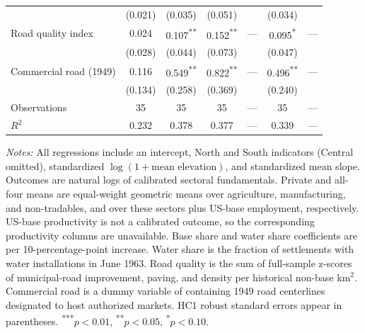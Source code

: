\documentclass[12pt, unicode, a4paper]{article}
\newcommand{\1}{\mbox{1}\hspace{-0.25em}\mbox{l}} %
\begin{document}
{\begin{table}[!htbp]
\begin{tabular*}{\linewidth}{@{\extracolsep{\fill}}lcccccc@{}}
 & (0.021) & (0.035) & (0.051) &  & (0.034) &  \\
Road quality index & 0.024 & 0.107\textsuperscript{**} & 0.152\textsuperscript{**} & --- & 0.095\textsuperscript{*} & --- \\
 & (0.028) & (0.044) & (0.073) &  & (0.047) &  \\
Commercial road (1949) & 0.116 & 0.549\textsuperscript{**} & 0.822\textsuperscript{**} & --- & 0.496\textsuperscript{**} & --- \\
 & (0.134) & (0.258) & (0.369) &  & (0.240) &  \\
\addlinespace[2pt]
Observations & 35 & 35 & 35 & --- & 35 & --- \\
\(R^{2}\) & 0.232 & 0.378 & 0.377 & --- & 0.339 & --- \\
\bottomrule
\end{tabular*}
\par\smallskip
\parbox{0.98\linewidth}{\fontsize{8}{9.5}\selectfont \textit{Notes:} All regressions include an intercept, North and South indicators (Central omitted), standardized $\log(1+\text{mean elevation})$, and standardized mean slope. Outcomes are natural logs of calibrated sectoral fundamentals. Private and all-four means are equal-weight geometric means over agriculture, manufacturing, and non-tradables, and over these sectors plus US-base employment, respectively. US-base productivity is not a calibrated outcome, so the corresponding productivity columns are unavailable. Base share and water share coefficients are per 10-percentage-point increase. Water share is the fraction of settlements with water installations in June 1963. Road quality is the sum of full-sample z-scores of municipal-road improvement, paving, and density per historical non-base km$^2$. Commercial road is a dummy variable of containing 1949 road centerlines designated to host authorized markets. HC1 robust standard errors appear in parentheses. \textsuperscript{***}$p<0.01$, \textsuperscript{**}$p<0.05$, \textsuperscript{*}$p<0.10$.}
\end{table}
}
\end{document}
